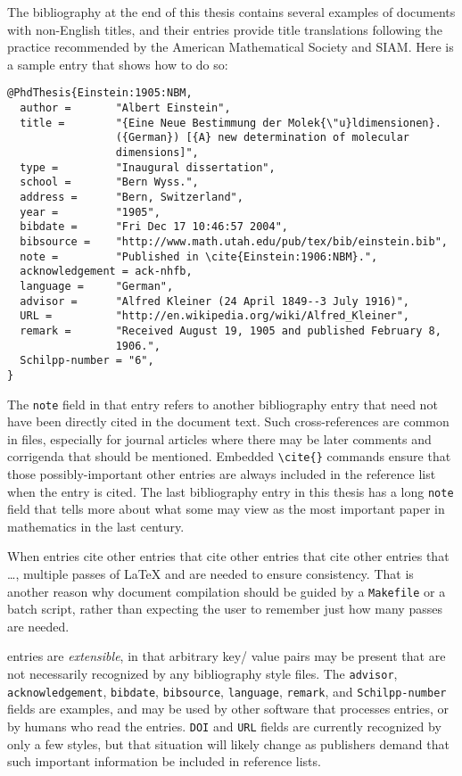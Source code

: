 The bibliography at the end of this thesis contains several examples
of documents with non-English titles, and their \BibTeX{} entries
provide title translations following the practice recommended by the
American Mathematical Society and SIAM\@.  Here is a sample entry that
shows how to do so:
%
\begin{verbatim}
@PhdThesis{Einstein:1905:NBM,
  author =       "Albert Einstein",
  title =        "{Eine Neue Bestimmung der Molek{\"u}ldimensionen}.
                 ({German}) [{A} new determination of molecular
                 dimensions]",
  type =         "Inaugural dissertation",
  school =       "Bern Wyss.",
  address =      "Bern, Switzerland",
  year =         "1905",
  bibdate =      "Fri Dec 17 10:46:57 2004",
  bibsource =    "http://www.math.utah.edu/pub/tex/bib/einstein.bib",
  note =         "Published in \cite{Einstein:1906:NBM}.",
  acknowledgement = ack-nhfb,
  language =     "German",
  advisor =      "Alfred Kleiner (24 April 1849--3 July 1916)",
  URL =          "http://en.wikipedia.org/wiki/Alfred_Kleiner",
  remark =       "Received August 19, 1905 and published February 8,
                 1906.",
  Schilpp-number = "6",
}
\end{verbatim}

The \verb=note= field in that entry refers to another bibliography
entry that need not have been directly cited in the document text.
Such cross-references are common in \BibTeX{} files, especially for
journal articles where there may be later comments and corrigenda that
should be mentioned.  Embedded \verb=\cite{}= commands ensure that
those possibly-important other entries are always included in the
reference list when the entry is cited.  The last bibliography entry
\cite{Wiles:1995:MEC} in this thesis has a long \verb=note= field
that tells more about what some may view as the most important paper
in mathematics in the last century.

When entries cite other entries that cite other entries that cite
other entries that \ldots{}, multiple passes of \LaTeX{} and \BibTeX{}
are needed to ensure consistency.  That is another reason why document
compilation should be guided by a \verb=Makefile= or a batch script,
rather than expecting the user to remember just how many passes are
needed.

\BibTeX{} entries are \emph{extensible}, in that arbitrary key\slash
value pairs may be present that are not necessarily recognized by any
bibliography style files.  The \verb=advisor=,
\verb=acknowledgement=, \verb=bibdate=, \verb=bibsource=,
\verb=language=, \verb=remark=, and \verb=Schilpp-number= fields
are examples, and may be used by other software that processes
\BibTeX{} entries, or by humans who read the entries.  \verb=DOI=
and \verb=URL= fields are currently recognized by only a few styles,
but that situation will likely change as publishers demand that such
important information be included in reference lists.

